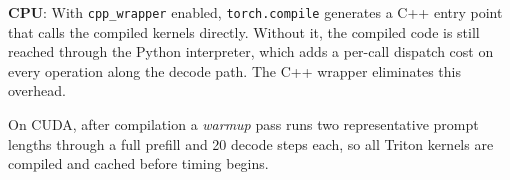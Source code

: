 \textbf{CPU}: With \texttt{cpp\_wrapper} enabled, \texttt{torch.compile} generates a C++ entry point that calls the compiled kernels directly. Without it, the compiled code is still reached through the Python interpreter, which adds a per-call dispatch cost on every operation along the decode path. The C++ wrapper eliminates this overhead.

On CUDA, after compilation a \emph{warmup} pass runs two representative prompt lengths through a full prefill and 20 decode steps each, so all Triton kernels are compiled and cached before timing begins.

